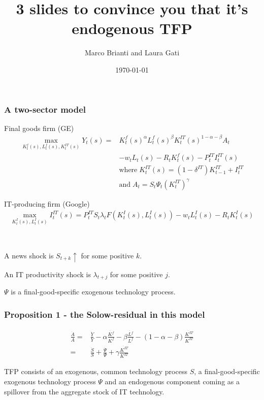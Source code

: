 \documentclass{beamer}
\author[Brianti, Gati]{Marco Brianti and Laura Gati}
\institute[Boston College]{Boston College}
\title{3 slides to convince you that it's endogenous TFP}
\date{\today}
\begin{document}
\begin{frame}

\maketitle


\end{frame}


\begin{frame}
\frametitle{A two-sector model}

Final goods firm (GE)
\begin{align*}
\max_{K^f_t(s), L^f_t(s), K^{IT}_t(s) } Y_t(s) =  & K^f_t(s)^{\alpha}L^f_t(s)^{\beta}K^{IT}_t(s)^{1-\alpha - \beta}A_t \\
 & - w_t L_t(s) -R_tK^f_t(s) -P^{IT}_t I^{IT}_t(s) \\
 & \text{where} \; K^{IT}_t(s) =  (1-\delta^{IT})K^{IT}_{t-1} + I^{IT}_t \\
 & \text{and} \; A_t =  S_t \Psi_t (K^{IT}_t)^{\gamma}
\end{align*}

IT-producing firm (Google)
\begin{align*}
\max_{K^{I}_t(s), L^{I}_t(s)} I^{IT}_t(s) = P^{IT}_t S_t \lambda_t F(K^I_t(s), L^I_t(s)) -w_t L^I_t(s) - R_t K^I_t(s)
\end{align*}

\

A news shock is $S_{t+k} \uparrow$ for some positive $k$. 

An IT productivity shock is $\lambda_{t+j}$ for some positive $j$. 

$\Psi$ is a final-good-specific exogenous technology process.

\end{frame}

\begin{frame}
\frametitle{Proposition 1 - the Solow-residual in this model}

\begin{align*}
\frac{\dot{A}}{A} = & \frac{\dot{Y}}{Y} - \alpha \frac{\dot{K^f}}{K^f} - \beta \frac{\dot{L^f}}{L^f} - (1-\alpha - \beta) \frac{\dot{K^{IT}}}{K^{IT}} \\
= & \frac{\dot{S}}{S} + \frac{\dot{\Psi}}{\Psi} + \gamma \frac{\dot{K^{IT}}}{K^{IT}}
\end{align*}

TFP consists of an exogenous, common technology process $S$, a final-good-specific exogenous technology process $\Psi$ and an endogenous component coming as a spillover from the aggregate stock of IT technology. 
\end{frame}
\end{document}
